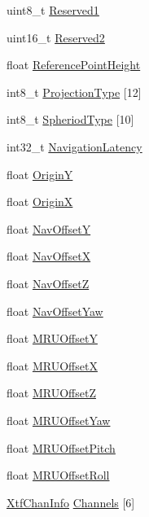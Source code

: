 \begin{DoxyCompactItemize}
uint8\+\_\+t \hyperlink{structXtfFileHeader_a7f71f2c11c7e7272f220495e8a622392}{Reserved1}
\item 
uint16\+\_\+t \hyperlink{structXtfFileHeader_ace47ee611ec4a68588f721b1b26e5e63}{Reserved2}
\item 
float \hyperlink{structXtfFileHeader_a6dbc0fdd85b3ced392a65effe583db3c}{Reference\+Point\+Height}
\item 
int8\+\_\+t \hyperlink{structXtfFileHeader_a08292e23bcee9ccbd738b098b288a919}{Projection\+Type} \mbox{[}12\mbox{]}
\item 
int8\+\_\+t \hyperlink{structXtfFileHeader_a634012d11a96a64b7844c105b44217bd}{Spheriod\+Type} \mbox{[}10\mbox{]}
\item 
int32\+\_\+t \hyperlink{structXtfFileHeader_a95cdc67cec15641bda7bc0addff5d414}{Navigation\+Latency}
\item 
float \hyperlink{structXtfFileHeader_a7b21704f379ce25117d694702045189c}{OriginY}
\item 
float \hyperlink{structXtfFileHeader_ab6e7da58bba25e17870f4666b5e07295}{OriginX}
\item 
float \hyperlink{structXtfFileHeader_a0d0cfe9d842a9445410d9f886b949927}{Nav\+OffsetY}
\item 
float \hyperlink{structXtfFileHeader_a49b9918649649708dae07261ea8f5a45}{Nav\+OffsetX}
\item 
float \hyperlink{structXtfFileHeader_aefb0b8f6ce50f860ede9943514738625}{Nav\+OffsetZ}
\item 
float \hyperlink{structXtfFileHeader_a22edd45c713124b52942185cfb4fa175}{Nav\+Offset\+Yaw}
\item 
float \hyperlink{structXtfFileHeader_ab3a315b69d166ce5e04d7e400cd0aed1}{M\+R\+U\+OffsetY}
\item 
float \hyperlink{structXtfFileHeader_aa5b7faae3076acae008aff436374d6e1}{M\+R\+U\+OffsetX}
\item 
float \hyperlink{structXtfFileHeader_a3094ed9e03b37b0924f46feae06f3c33}{M\+R\+U\+OffsetZ}
\item 
float \hyperlink{structXtfFileHeader_a70e48d6a8d5f2b869039e6a0a8839374}{M\+R\+U\+Offset\+Yaw}
\item 
float \hyperlink{structXtfFileHeader_aaadb5b9e13ee540523ad9806b75ca2ac}{M\+R\+U\+Offset\+Pitch}
\item 
float \hyperlink{structXtfFileHeader_a50244f5a0b3f6c96008a4de47c8c5ad1}{M\+R\+U\+Offset\+Roll}
\item 
\hyperlink{structXtfChanInfo}{Xtf\+Chan\+Info} \hyperlink{structXtfFileHeader_ab8e7fea8570e605686c319d86d99f1bc}{Channels} \mbox{[}6\mbox{]}
\end{DoxyCompactItemize}



